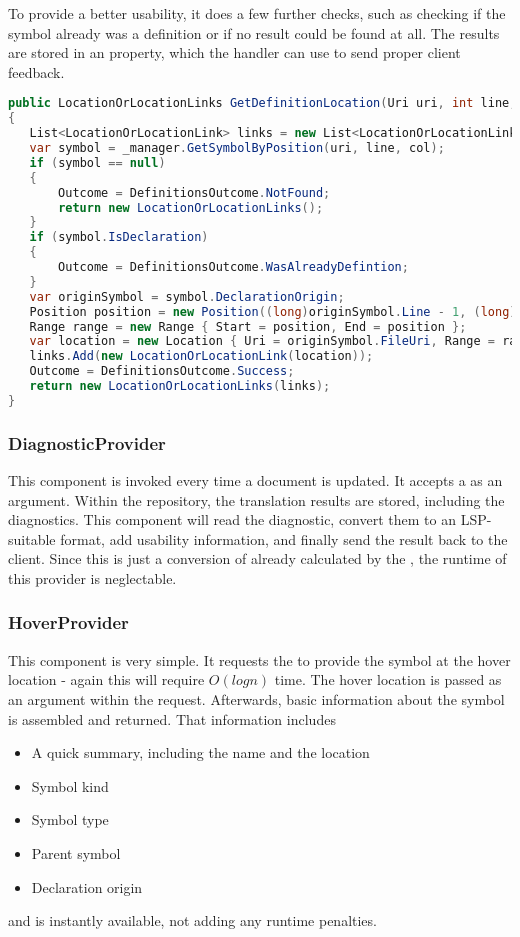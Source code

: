 To provide a better usability, it does a few further checks, such as checking if the symbol already was a definition or if no result could be found at all.
The results are stored in an  property, which the handler can use to send proper client feedback.\\

\begin{lstlisting}[language=csharp, caption={Providing Goto Definition}, captionpos=b, label={lst:gotoCore}]
public LocationOrLocationLinks GetDefinitionLocation(Uri uri, int line, int col)
{
   List<LocationOrLocationLink> links = new List<LocationOrLocationLink>();
   var symbol = _manager.GetSymbolByPosition(uri, line, col);
   if (symbol == null)
   {
       Outcome = DefinitionsOutcome.NotFound;
       return new LocationOrLocationLinks();
   }
   if (symbol.IsDeclaration)
   {
       Outcome = DefinitionsOutcome.WasAlreadyDefintion;
   }
   var originSymbol = symbol.DeclarationOrigin;
   Position position = new Position((long)originSymbol.Line - 1, (long)originSymbol.ColumnStart - 1);
   Range range = new Range { Start = position, End = position };
   var location = new Location { Uri = originSymbol.FileUri, Range = range };
   links.Add(new LocationOrLocationLink(location));
   Outcome = DefinitionsOutcome.Success;
   return new LocationOrLocationLinks(links);
}
\end{lstlisting}

\subsubsection{DiagnosticProvider}
This component is invoked every time a document is updated.
It accepts a  as an argument.
Within the repository, the translation results are stored, including the diagnostics.
This component will read the diagnostic, convert them to an LSP-suitable format, add usability information, and finally send the result back to the client.
Since this is just a conversion of already calculated  by the , the runtime of this provider is neglectable.

\subsubsection{HoverProvider}
This component is very simple.
It requests the  to provide the symbol at the hover location - again this will require $O(logn)$ time.
The hover location is passed as an argument within the request.
Afterwards, basic information about the symbol is assembled and returned.
That information includes
\begin{itemize}
    \item A quick summary, including the name and the location
    \item Symbol kind
    \item Symbol type
    \item Parent symbol
    \item Declaration origin
\end{itemize}
and is instantly available, not adding any runtime penalties.

